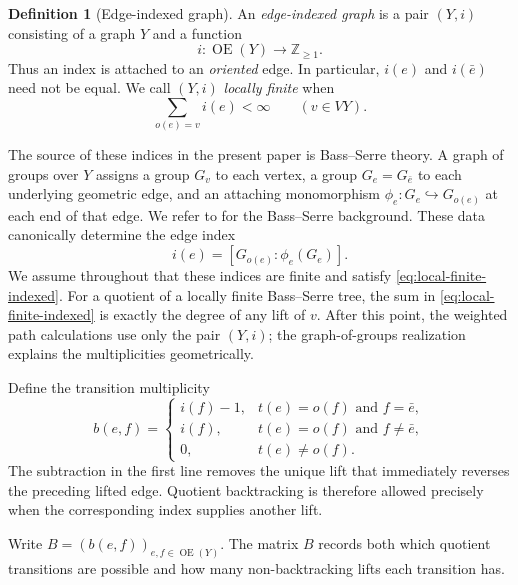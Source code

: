 \documentclass[11pt,reqno]{amsart}
\numberwithin{equation}{section}
\theoremstyle{definition}
\newtheorem{definition}[theorem]{Definition}
\theoremstyle{remark}
\newcommand{\OrE}{\operatorname{OE}}
\begin{document}
\begin{definition}[Edge-indexed graph]\label{def:edge-indexed-graph}
An \emph{edge-indexed graph} is a pair $(Y,i)$ consisting of a graph $Y$ and
a function
\[
 i:\OrE(Y)\longrightarrow \mathbb Z_{\ge1}.
\]
Thus an index is attached to an \emph{oriented} edge.  In particular,
$i(e)$ and $i(\bar e)$ need not be equal.  We call $(Y,i)$ \emph{locally
finite} when
\begin{equation}\label{eq:local-finite-indexed}
 \sum_{o(e)=v}i(e)<\infty
 \qquad(v\in VY).
\end{equation}
\end{definition}

The source of these indices in the present paper is Bass--Serre theory.  A
graph of groups over $Y$ assigns a group $G_v$ to each vertex, a group
$G_e=G_{\bar e}$ to each underlying geometric edge, and an attaching
monomorphism $\phi_e:G_e\hookrightarrow G_{o(e)}$ at each end of that edge.
We refer to \cite{Serre2003,BassLubotzky2001} for the Bass--Serre background.
These data canonically determine the edge index
\[
 i(e)=[G_{o(e)}:\phi_e(G_e)].
\]
We assume throughout that these indices are finite and satisfy
\eqref{eq:local-finite-indexed}.  For a quotient of a locally finite
Bass--Serre tree, the sum in \eqref{eq:local-finite-indexed} is exactly the
degree of any lift of $v$.  After this point, the weighted path calculations
use only the pair $(Y,i)$; the graph-of-groups realization explains the
multiplicities geometrically.

Define the transition multiplicity
\begin{equation}\label{eq:transition}
 b(e,f)=
 \begin{cases}
 i(f)-1,&t(e)=o(f)\text{ and }f=\bar e,\\
 i(f),&t(e)=o(f)\text{ and }f\ne\bar e,\\
 0,&t(e)\ne o(f).
 \end{cases}
\end{equation}
The subtraction in the first line removes the unique lift that immediately
reverses the preceding lifted edge.  Quotient backtracking is therefore
allowed precisely when the corresponding index supplies another lift.

Write $B=(b(e,f))_{e,f\in\OrE(Y)}$.  The matrix $B$ records both which
quotient transitions are possible and how many non-backtracking lifts each
transition has.
\end{document}
